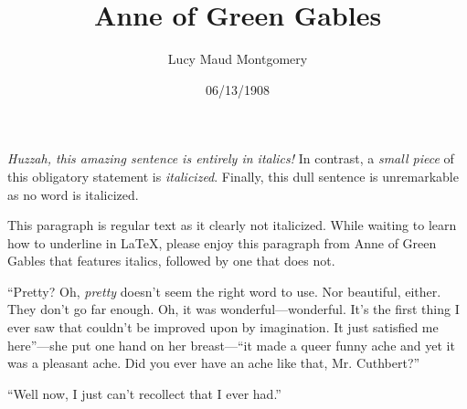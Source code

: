 \documentclass[a4paper]{article}
\title{Anne of Green Gables}
\author{Lucy Maud Montgomery}
\date{06/13/1908}
\begin{document}
\maketitle

\textit{Huzzah, this amazing sentence is entirely in italics!} In contrast, a \textit{small piece} of this obligatory statement is \textit{italicized}. Finally, this dull sentence is unremarkable as no word is italicized.

This paragraph is regular text as it clearly not italicized. While waiting to learn how to underline in \LaTeX, please enjoy this paragraph from Anne of Green Gables that features italics, followed by one that does not.

``Pretty? Oh, \textit{pretty} doesn't seem the right word to use. Nor beautiful, either. They don't go far enough. Oh, it was wonderful---wonderful. It's the first thing I ever saw that couldn't be improved upon by imagination. It just satisfied me here''---she put one hand on her breast---``it made a queer funny ache and yet it was a pleasant ache. Did you ever have an ache like that, Mr. Cuthbert?''

``Well now, I just can't recollect that I ever had.''
\end{document}
